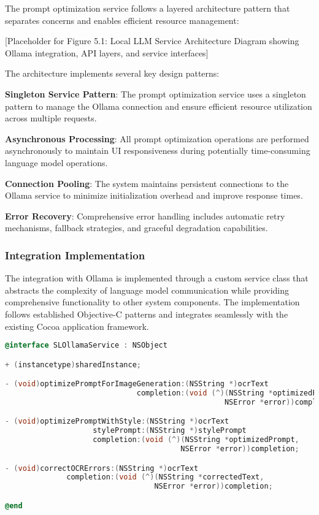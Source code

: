 The prompt optimization service follows a layered architecture pattern that separates concerns and enables efficient resource management:

[Placeholder for Figure 5.1: Local LLM Service Architecture Diagram showing Ollama integration, API layers, and service interfaces]

The architecture implements several key design patterns:

\textbf{Singleton Service Pattern}: The prompt optimization service uses a singleton pattern to manage the Ollama connection and ensure efficient resource utilization across multiple requests.

\textbf{Asynchronous Processing}: All prompt optimization operations are performed asynchronously to maintain UI responsiveness during potentially time-consuming language model operations.

\textbf{Connection Pooling}: The system maintains persistent connections to the Ollama service to minimize initialization overhead and improve response times.

\textbf{Error Recovery}: Comprehensive error handling includes automatic retry mechanisms, fallback strategies, and graceful degradation capabilities.

\subsubsection{Integration Implementation}

The integration with Ollama is implemented through a custom service class that abstracts the complexity of language model communication while providing comprehensive functionality to other system components. The implementation follows established Objective-C patterns and integrates seamlessly with the existing Cocoa application framework.

\begin{lstlisting}[language=C,basicstyle=\footnotesize\ttfamily,frame=single,breaklines=true,columns=flexible,caption={Ollama Service Integration Interface},label={lst:ollama_interface}]
@interface SLOllamaService : NSObject

+ (instancetype)sharedInstance;

- (void)optimizePromptForImageGeneration:(NSString *)ocrText
                              completion:(void (^)(NSString *optimizedPrompt, 
                                                  NSError *error))completion;

- (void)optimizePromptWithStyle:(NSString *)ocrText
                    stylePrompt:(NSString *)stylePrompt
                    completion:(void (^)(NSString *optimizedPrompt, 
                                        NSError *error))completion;

- (void)correctOCRErrors:(NSString *)ocrText
              completion:(void (^)(NSString *correctedText, 
                                  NSError *error))completion;

@end
\end{lstlisting}

